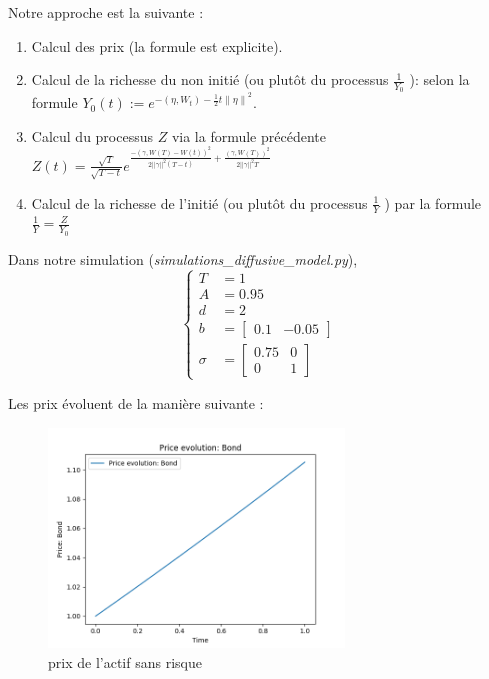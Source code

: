 \documentclass[../finalreport.tex]{subfiles}
\begin{document}
\par Notre approche est la suivante : 
\begin{enumerate}
\item Calcul des prix (la formule est explicite).
\item Calcul de la richesse du non initié (ou plutôt du processus $\frac{1}{Y_0}$ ): selon la formule $ Y_0 \left( t \right) := e^{- \left( \eta, W_{t} \right)-\frac{1}{2} t {\| \eta \|}^{2}} $.
\item Calcul du processus $Z$ via la formule précédente $Z \left( t \right) = \frac{\sqrt{T}}{\sqrt{T - t}} e^{\frac{- \left( \gamma, W \left( T \right) - W \left( t \right) \right)^2}{2 ||\gamma||^2 \left( T - t \right)} + \frac{\left( \gamma, W \left( T \right) \right)^2}{2 ||\gamma||^2 T }}$
\item Calcul de la richesse de l'initié (ou plutôt du processus $\frac{1}{Y}$ ) par la formule $\frac{1}{Y} = \frac{Z}{Y_0}$ 
\end{enumerate}

\par Dans notre simulation (\emph{simulations\_diffusive\_model.py}), 
\begin{displaymath}
\begin{cases}
T &= 1 \\
A &= 0.95 \\
d &= 2 \\
b &= \begin{bmatrix}
		0.1 & -0.05
	\end{bmatrix} \\
\sigma &= \begin{bmatrix}
			0.75 & 0 \\
			0 & 1
		  \end{bmatrix}
\end{cases}
\end{displaymath}

\par Les prix évoluent de la manière suivante :
\begin{figure}[H]
  \centering
    \includegraphics[width=0.7\textwidth]{images/simulation_1/price_0.png}
  \caption{prix de l'actif sans risque}
\end{figure}
\end{document}
